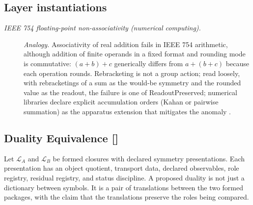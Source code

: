 \subsection*{Layer instantiations}\label{layer-inst:F40}

\begingroup\small
\begin{description}
\item[\emph{{IEEE} 754 floating-point non-associativity (numerical
computing).}] \textit{Analogy.}
Associativity of real addition fails in IEEE 754 arithmetic, although addition of finite operands in a fixed format and rounding mode is commutative: \((a+b)+c\) generically differs from \(a+(b+c)\) because each operation rounds. Rebracketing is not a group action; read loosely, with rebracketings of a sum as the would-be symmetry and the rounded value as the readout, the failure is one of ReadoutPreserved; numerical
libraries declare explicit accumulation orders (Kahan or
pairwise summation) as the apparatus extension that mitigates the
anomaly
\citep{IEEE7542019FloatingPoint}.

\end{description}
\endgroup


\subsection{Duality Equivalence [\texorpdfstring{}{F41}]}\label{sec:symmetry:duality-equivalence}

Let \(\mathcal L_A\) and \(\mathcal L_B\) be formed closures with
declared symmetry presentations.  Each presentation has an object
quotient, transport data, declared observables, role registry,
residual registry, and status discipline.  A proposed duality is not
just a dictionary between symbols.  It is a pair of translations
between the two formed packages, with the claim that the translations
preserve the roles being compared.

